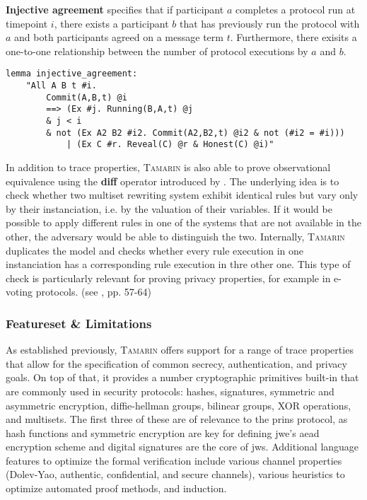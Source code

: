 \textbf{Injective agreement} specifies that if participant $a$ completes a protocol run at timepoint $i$, there exists a participant $b$ that has previously run the protocol with $a$ and both participants agreed on a message term $t$.
Furthermore, there exisits a one-to-one relationship between the number of protocol executions by $a$ and $b$.

\begin{lstlisting}
lemma injective_agreement:
    "All A B t #i. 
        Commit(A,B,t) @i
        ==> (Ex #j. Running(B,A,t) @j
        & j < i
        & not (Ex A2 B2 #i2. Commit(A2,B2,t) @i2 & not (#i2 = #i)))
            | (Ex C #r. Reveal(C) @r & Honest(C) @i)"
\end{lstlisting}

In addition to trace properties, \textsc{Tamarin} is also able to prove observational equivalence using the \textsf{\textbf{diff}} operator introduced by \cite{basin2015automated}.
The underlying idea is to check whether two multiset rewriting system exhibit identical rules but vary only by their instanciation, i.e. by the valuation of their variables.
If it would be possible to apply different rules in one of the systems that are not available in the other, the adversary would be able to distinguish the two.
Internally, \textsc{Tamarin} duplicates the model and checks whether every rule execution in one instanciation has a corresponding rule execution in thre other one.
This type of check is particularly relevant for proving privacy properties, for example in e-voting protocols. (see \cite{tamarin2019manual}, pp. 57-64)

\subsubsection{Featureset \& Limitations}

As established previously, \textsc{Tamarin} offers support for a range of trace properties that allow for the specification of common secrecy, authentication, and privacy goals.
On top of that, it provides a number cryptographic primitives built-in that are commonly used in security protocols: hashes, signatures, symmetric and asymmetric encryption, diffie-hellman groups, bilinear groups, XOR operations, and multisets. 
The first three of these are of relevance to the \gls{prins} protocol, as hash functions and symmetric encryption are key for defining \gls{jwe}'s \gls{aead} encryption scheme and digital signatures are the core of \gls{jws}.
Additional language features to optimize the formal verification include various channel properties (Dolev-Yao, authentic, confidential, and secure channels), various heuristics to optimize automated proof methods, and induction.

